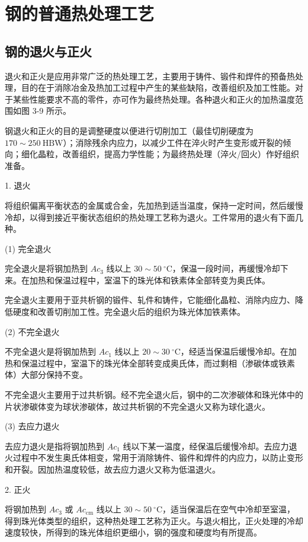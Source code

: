 \documentclass[UTF8]{ctexbook}
\newcommand{\◎}{\ensuremath{\bigcirc}}
\begin{document}
\section{钢的普通热处理工艺}
\subsection{钢的退火与正火}
退火和正火是应用非常广泛的热处理工艺，主要用于铸件、锻件和焊件的预备热处理，目的在于消除冶金及热加工过程中产生的某些缺陷，改善组织及加工性能。对于某些性能要求不高的零件，亦可作为最终热处理。各种退火和正火的加热温度范围如图 3-9 所示。

钢退火和正火的目的是调整硬度以便进行切削加工（最佳切削硬度为 $170 \sim 250~\text{HBW}$）；消除残余内应力，以减少工件在淬火时产生变形或开裂的倾向；细化晶粒，改善组织，提高力学性能；为最终热处理（淬火/回火）作好组织准备。

1. 退火

将组织偏离平衡状态的金属或合金，先加热到适当温度，保持一定时间，然后缓慢冷却，以得到接近平衡状态组织的热处理工艺称为退火。工件常用的退火有下面几种。

(1) 完全退火

完全退火是将钢加热到 $Ac_3$ 线以上 $30 \sim 50~^\circ\text{C}$，保温一段时间，再缓慢冷却下来。在加热和保温过程中，室温下的珠光体和铁素体全部转变为奥氏体。

完全退火主要用于亚共析钢的锻件、轧件和铸件，它能细化晶粒、消除内应力、降低硬度和改善切削加工性。完全退火后的组织为珠光体加铁素体。

(2) 不完全退火

不完全退火是将钢加热到 $Ac_1$ 线以上 $20 \sim 30~^\circ\text{C}$，经适当保温后缓慢冷却。在加热和保温过程中，室温下的珠光体全部转变成奥氏体，而过剩相（渗碳体或铁素体）大部分保持不变。

不完全退火主要用于过共析钢。经不完全退火后，钢中的二次渗碳体和珠光体中的片状渗碳体变为球状渗碳体，故过共析钢的不完全退火又称为球化退火。

(3) 去应力退火

去应力退火是指将钢加热到 $Ac_1$ 线以下某一温度，经保温后缓慢冷却。去应力退火过程中不发生奥氏体相变，常用于消除铸件、锻件和焊件的内应力，以防止变形和开裂。因加热温度较低，故去应力退火又称为低温退火。

2. 正火

将钢加热到 $Ac_3$ 或 $Ac_{\text{cm}}$ 线以上 $30 \sim 50~^\circ\text{C}$，适当保温后在空气中冷却至室温，得到珠光体类型的组织，这种热处理工艺称为正火。与退火相比，正火处理的冷却速度较快，所得到的珠光体组织更细小，钢的强度和硬度均有所提高。
\end{document}
